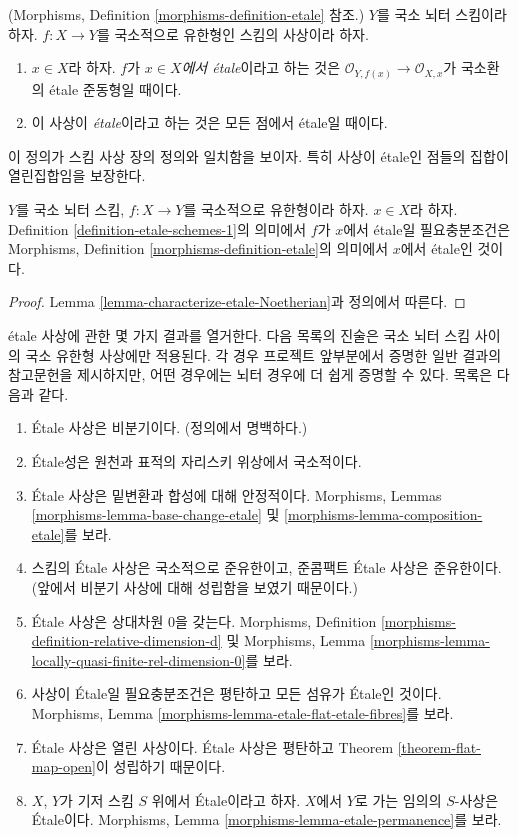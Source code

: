 \begin{definition}
\label{definition-etale-schemes-1}
(Morphisms, Definition \ref{morphisms-definition-etale} 참조.)
$Y$를 국소 뇌터 스킴이라 하자.
$f : X \to Y$를 국소적으로 유한형인 스킴의 사상이라 하자.
\begin{enumerate}
\item $x \in X$라 하자. $f$가 {\it $x \in X$에서 \'etale}이라고
하는 것은 $\mathcal{O}_{Y, f(x)} \to \mathcal{O}_{X, x}$가
국소환의 \'etale 준동형일 때이다.
\item 이 사상이 {\it \'etale}이라고 하는 것은 모든 점에서
\'etale일 때이다.
\end{enumerate}
\end{definition}

\noindent
이 정의가 스킴 사상 장의 정의와 일치함을 보이자.
특히 사상이 \'etale인 점들의 집합이 열린집합임을 보장한다.

\begin{lemma}
\label{lemma-etale-definition}
$Y$를 국소 뇌터 스킴, $f : X \to Y$를 국소적으로 유한형이라 하자.
$x \in X$라 하자. Definition
\ref{definition-etale-schemes-1}의 의미에서 $f$가 $x$에서
\'etale일 필요충분조건은 Morphisms, Definition
\ref{morphisms-definition-etale}의 의미에서 $x$에서 \'etale인 것이다.
\end{lemma}

\begin{proof}
Lemma \ref{lemma-characterize-etale-Noetherian}과 정의에서 따른다.
\end{proof}

\noindent
\'etale 사상에 관한 몇 가지 결과를 열거한다.
다음 목록의 진술은 국소 뇌터 스킴 사이의 국소 유한형 사상에만
적용된다. 각 경우 프로젝트 앞부분에서 증명한 일반 결과의
참고문헌을 제시하지만, 어떤 경우에는 뇌터 경우에 더 쉽게
증명할 수 있다. 목록은 다음과 같다.
\begin{enumerate}
\item \'Etale 사상은 비분기이다. (정의에서 명백하다.)
\item \'Etale성은 원천과 표적의 자리스키 위상에서 국소적이다.
\item \'Etale 사상은 밑변환과 합성에 대해 안정적이다.
Morphisms, Lemmas \ref{morphisms-lemma-base-change-etale} 및
\ref{morphisms-lemma-composition-etale}를 보라.
\item 스킴의 \'Etale 사상은 국소적으로 준유한이고,
준콤팩트 \'Etale 사상은 준유한이다. (앞에서 비분기 사상에 대해
성립함을 보였기 때문이다.)
\item \'Etale 사상은 상대차원 $0$을 갖는다. Morphisms, Definition
\ref{morphisms-definition-relative-dimension-d} 및
Morphisms, Lemma \ref{morphisms-lemma-locally-quasi-finite-rel-dimension-0}를 보라.
\item 사상이 \'Etale일 필요충분조건은 평탄하고 모든 섬유가
\'Etale인 것이다. Morphisms, Lemma
\ref{morphisms-lemma-etale-flat-etale-fibres}를 보라.
\item \'Etale 사상은 열린 사상이다. \'Etale 사상은 평탄하고
Theorem \ref{theorem-flat-map-open}이 성립하기 때문이다.
\item $X$, $Y$가 기저 스킴 $S$ 위에서 \'Etale이라고 하자.
$X$에서 $Y$로 가는 임의의 $S$-사상은 \'Etale이다.
Morphisms, Lemma \ref{morphisms-lemma-etale-permanence}를 보라.
\end{enumerate}


